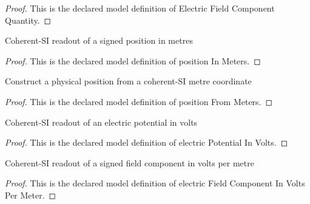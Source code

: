 \begin{proof}
  This is the declared model definition of Electric Field Component Quantity.
\end{proof}
\begin{definition}
  \label{def:physics:phyx-mini-0868:phyxminiproblems-problemphyxmini0868-positioninmeters}
  Coherent-SI readout of a signed position in metres
\end{definition}
\begin{proof}
  This is the declared model definition of position In Meters.
\end{proof}
\begin{definition}
  \label{def:physics:phyx-mini-0868:phyxminiproblems-problemphyxmini0868-positionfrommeters}
  Construct a physical position from a coherent-SI metre coordinate
\end{definition}
\begin{proof}
  This is the declared model definition of position From Meters.
\end{proof}
\begin{definition}
  \label{def:physics:phyx-mini-0868:phyxminiproblems-problemphyxmini0868-electricpotentialinvolts}
  Coherent-SI readout of an electric potential in volts
\end{definition}
\begin{proof}
  This is the declared model definition of electric Potential In Volts.
\end{proof}
\begin{definition}
  \label{def:physics:phyx-mini-0868:phyxminiproblems-problemphyxmini0868-electricfieldcomponentinvoltspermeter}
  Coherent-SI readout of a signed field component in volts per metre
\end{definition}
\begin{proof}
  This is the declared model definition of electric Field Component In Volts Per Meter.
\end{proof}
